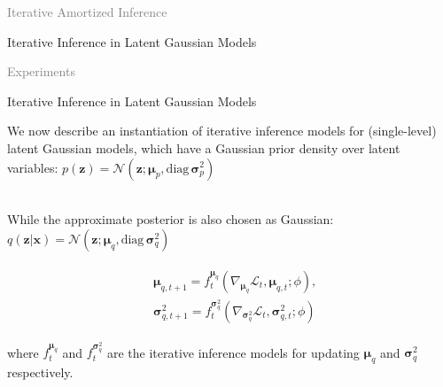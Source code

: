 \documentclass{beamer}		%
\newcommand{\light}[1]{\textcolor{gray}{#1}}
\begin{document}
\begin{frame}[noframenumbering]
\begin{itemize}
    \begin{LARGE}
    \item \light{Iterative Amortized Inference}
    \item Iterative Inference in Latent Gaussian Models
    \item \light{Experiments}
    \end{LARGE}
\end{itemize}
\end{frame}



\begin{frame}{Iterative Inference in Latent Gaussian Models}

We now describe an instantiation of iterative inference models for (single-level) latent Gaussian models, which have a Gaussian prior density over latent variables: $p(\bm{z})=\mathcal{N}(\bm{z};\bm{\mu}_p, \text{diag} \, \bm{\sigma}^2_p)$

~\\
While the approximate posterior is also chosen as Gaussian:$q(\bm{z}|\bm{x})=\mathcal{N}(\bm{z};\bm{\mu}_q,\text{diag}\, \bm{\sigma}^2_q)$


\begin{eqnarray*}
\begin{aligned}
&\bm{\mu}_{q,t+1}=f_t^{\bm{\mu}_q}(\nabla_{\bm{\mu}_q} \mathcal{L}_t, \bm{\mu}_{q,t}; \phi),\\
&\bm{\sigma}_{q,t+1}^2=f_t^{\bm{\sigma}^2_q}(\nabla_{\bm{\sigma}_q^2} \mathcal{L}_t, \bm{\sigma}^2_{q,t}; \phi)
\end{aligned}    
\end{eqnarray*}

where $f_t^{\bm{\mu}_q}$ and $f_t^{\bm{\sigma}^2_q}$ are the iterative inference models for
updating $\bm{\mu}_q$ and $\bm{\sigma}_q^2$ respectively.

\end{frame}
\end{document}

